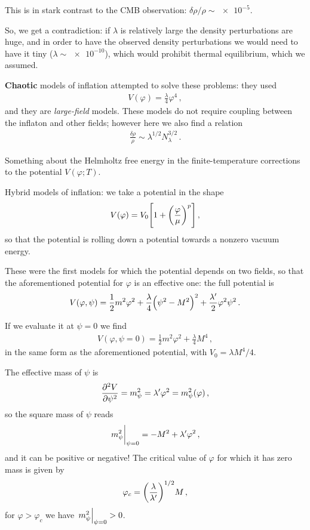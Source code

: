 \documentclass[main.tex]{subfiles}
\begin{document}
This is in stark contrast to the CMB observation: \(\delta \rho /\rho \sim \num{e-5}\). 

So, we get a contradiction: if \(\lambda \) is relatively large the density perturbations are huge, and in order to have the observed density perturbations we would need to have it tiny (\(\lambda \sim \num{e-10}\)), which would prohibit thermal equilibrium, which we assumed. 

\textbf{Chaotic} models of inflation attempted to solve these problems: they used 
%
\begin{align}
V(\varphi ) = \frac{\lambda}{4} \varphi^{4}
\,,
\end{align}
%
and they are \emph{large-field} models. 
These models do not require coupling between the inflaton and other fields; however here we also find a relation 
%
\begin{align}
\frac{ \delta \rho }{\rho } \sim \lambda^{1/2} N_\lambda^{3/2}
\,.
\end{align}

Something about the Helmholtz free energy in the finite-temperature corrections to the potential \(V(\varphi ; T)\). 

Hybrid models of inflation: we take a potential in the shape 
%
\begin{align}
V(\varphi ) = V_0 \qty[1 + \qty(\frac{\varphi }{\mu })^{p}]
\,,
\end{align}
%
so that the potential is rolling down a potential towards a nonzero vacuum energy. 

These were the first models for which the potential depends on two fields, so that the aforementioned potential for \(\varphi \) is an effective one: the full potential is 
%
\begin{align}
V(\varphi , \psi ) = \frac{1}{2} m^2\varphi^2+ \frac{\lambda}{4} \qty(\psi^2-M^2)^2 + \frac{\lambda'}{2} \varphi^2 \psi^2
\,.
\end{align}

If we evaluate it at \(\psi = 0\) we find 
%
\begin{align}
V(\varphi , \psi = 0) = \frac{1}{2} m^2\varphi^2 + \frac{\lambda}{4} M^{4}
\,,
\end{align}
%
in the same form as the aforementioned potential, with \(V_0 = \lambda M^{4} /4\). 

The effective mass of \(\psi \) is
%
\begin{align}
\pdv[2]{V}{\psi } = m^2_\psi = \lambda ' \varphi^2 = m^2_\psi (\varphi )
\,,
\end{align}
%
so the square mass of \(\psi \) reads 
%
\begin{align}
\eval{m^2_\psi}_{\psi = 0} = - M^2 + \lambda ' \varphi^2
\,,
\end{align}
%
and it can be positive or negative! The critical value of \(\varphi \) for which it has zero mass is given by 
%
\begin{align}
\varphi _c = \qty( \frac{\lambda }{\lambda'})^{1/2} M
\,,
\end{align}
%
for \(\varphi > \varphi _c\) we have \(\eval{m^2_\psi }_{\psi = 0} > 0\).
\end{document}
